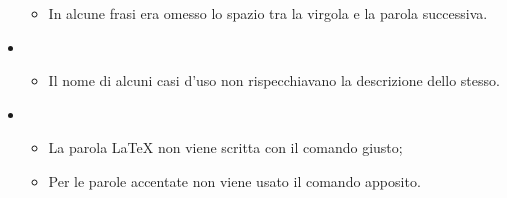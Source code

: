 \begin{itemize}
\begin{itemize}
\item In alcune frasi era omesso lo spazio tra la virgola e la parola successiva.
\end{itemize}
\item {}
\begin{itemize}
\item Il nome di alcuni casi d'uso non rispecchiavano la descrizione dello stesso.
\end{itemize}
\item \grassetto{\LaTeX{}}
\begin{itemize}
\item La parola \LaTeX{} non viene scritta con il comando giusto;
\item Per le parole accentate non viene usato il comando apposito.
\end{itemize}
\end{itemize}



